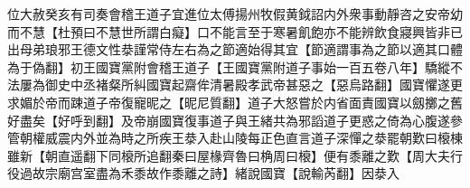 位大赦癸亥有司奏會稽王道子宜進位太傅揚州牧假黄鉞詔内外衆事動靜咨之安帝幼而不慧【杜預曰不慧世所謂白癡】口不能言至于寒暑飢飽亦不能辨飲食寢興皆非已出母弟琅邪王德文性㳟謹常侍左右為之節適始得其宜【節適謂事為之節以適其口體為于偽翻】初王國寶黨附會稽王道子【王國寶黨附道子事始一百五卷八年】驕縱不法屢為御史中丞褚粲所糾國寶起齋侔清暑殿孝武帝甚惡之【惡烏路翻】國寶懼遂更求媚於帝而踈道子帝復寵昵之【昵尼質翻】道子大怒嘗於内省面責國寶以劔擲之舊好盡矣【好呼到翻】及帝崩國寶復事道子與王緒共為邪謟道子更惑之倚為心腹遂參管朝權威震内外並為時之所疾王㳟入赴山陵每正色直言道子深憚之㳟罷朝歎曰榱棟雖新【朝直遥翻下同榱所追翻秦曰屋椽齊魯曰桷周曰榱】便有黍離之歎【周大夫行役過故宗廟宫室盡為禾黍故作黍離之詩】緒說國寶【說輸芮翻】因㳟入